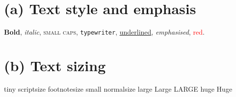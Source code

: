 \documentclass{article}
\begin{document}
	
	\section*{(a) Text style and emphasis}
	\textbf{Bold}, \textit{italic}, \textsc{small caps}, \texttt{typewriter}, \underline{underlined}, \emph{emphasised}, \textcolor{red}{red}.
	
	\section*{(b) Text sizing}
	{\tiny tiny} {\scriptsize scriptsize} {\footnotesize footnotesize} {\small small} {\normalsize normalsize} {\large large} {\Large Large} {\LARGE LARGE} {\huge huge} {\Huge Huge}
	
\end{document}
